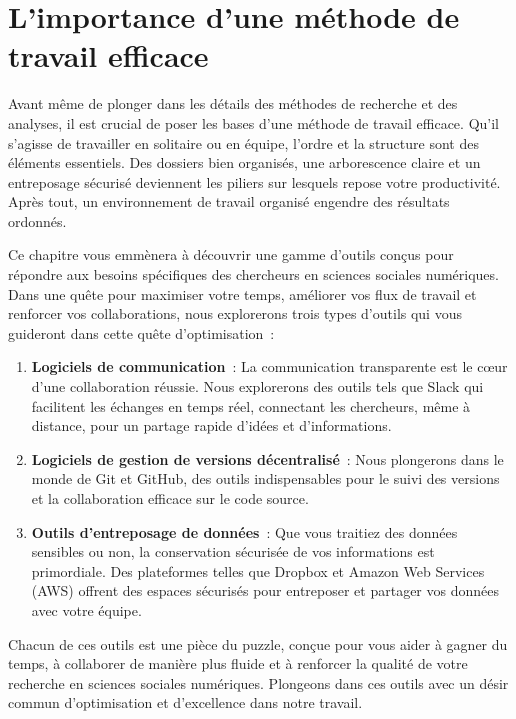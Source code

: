 \documentclass[
  letterpaper,
  DIV=11,
  numbers=noendperiod]{scrreprt}
\begin{document}
\section{L'importance d'une méthode de travail
efficace}\label{limportance-dune-muxe9thode-de-travail-efficace}

Avant même de plonger dans les détails des méthodes de recherche et des
analyses, il est crucial de poser les bases d'une méthode de travail
efficace. Qu'il s'agisse de travailler en solitaire ou en équipe,
l'ordre et la structure sont des éléments essentiels. Des dossiers bien
organisés, une arborescence claire et un entreposage sécurisé deviennent
les piliers sur lesquels repose votre productivité. Après tout, un
environnement de travail organisé engendre des résultats ordonnés.

Ce chapitre vous emmènera à découvrir une gamme d'outils conçus pour
répondre aux besoins spécifiques des chercheurs en sciences sociales
numériques. Dans une quête pour maximiser votre temps, améliorer vos
flux de travail et renforcer vos collaborations, nous explorerons trois
types d'outils qui vous guideront dans cette quête d'optimisation~:

\begin{enumerate}
\def\labelenumi{\arabic{enumi}.}
\item
  \textbf{Logiciels de communication}~: La communication transparente
  est le cœur d'une collaboration réussie. Nous explorerons des outils
  tels que Slack qui facilitent les échanges en temps réel, connectant
  les chercheurs, même à distance, pour un partage rapide d'idées et
  d'informations.
\item
  \textbf{Logiciels de gestion de versions décentralisé}~: Nous
  plongerons dans le monde de Git et GitHub, des outils indispensables
  pour le suivi des versions et la collaboration efficace sur le code
  source.
\item
  \textbf{Outils d'entreposage de données}~: Que vous traitiez des
  données sensibles ou non, la conservation sécurisée de vos
  informations est primordiale. Des plateformes telles que Dropbox et
  Amazon Web Services (AWS) offrent des espaces sécurisés pour
  entreposer et partager vos données avec votre équipe.
\end{enumerate}

Chacun de ces outils est une pièce du puzzle, conçue pour vous aider à
gagner du temps, à collaborer de manière plus fluide et à renforcer la
qualité de votre recherche en sciences sociales numériques. Plongeons
dans ces outils avec un désir commun d'optimisation et d'excellence dans
notre travail.
\end{document}
